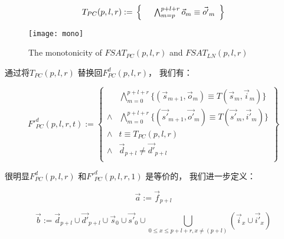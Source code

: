 \begin{equation}\label{tpc}
T_{PC}(p,l,r):=\\
\left\{
\begin{array}{cc}
      &\bigwedge_{m=p}^{p+l+r}\vec{o}_m\equiv \vec{o'}_m \\
\end{array}
\right\}
\end{equation}

\begin{figure}[b]
\begin{center}
\texttt{[image: mono]}
\end{center}
\caption{The monotonicity of $FSAT_{PC}(p,l,r)$ and $FSAT_{LN}(p,l,r)$}
  \label{fig_mono}
\end{figure}

通过将$T_{PC}(p,l,r)$ 替换回$F^d_{PC}(p,l,r)$，
我们有：

\begin{equation}\label{fpcq}
F'^d_{PC}(p,l,r,t):=
\left\{
\begin{array}{cc}
&\bigwedge_{m=0}^{p+l+r}
\{
(\vec{s}_{m+1},\vec{o}_m)\equiv T(\vec{s}_m,\vec{i}_m)
\}
\\
\wedge&\bigwedge_{m=0}^{p+l+r}
\{
(\vec{s'}_{m+1},\vec{o'}_m)\equiv T(\vec{s'}_m,\vec{i'}_m)
\}
\\
\wedge& t\equiv T_{PC}(p,l,r)\\
\wedge& \vec{d}_{p+l}\ne \vec{d'}_{p+l} \\
\end{array}
\right\}
\end{equation}


很明显$F^d_{PC}(p,l,r)$ 和$F'^d_{PC}(p,l,r,1)$ 是等价的，
我们进一步定义：

\begin{equation}\label{pcdef1}
\vec{a}:=\vec{f}_{p+l}
\end{equation}

\begin{equation}\label{pcdef2}
\vec{b}:=\vec{d}_{p+l}\cup \vec{d'}_{p+l}\cup \vec{s}_0\cup \vec{s'}_0\cup\bigcup_{0\le x\le p+l+r,x\neq (p+l)}(\vec{i}_{x}\cup\vec{i'}_{x})
\end{equation}

